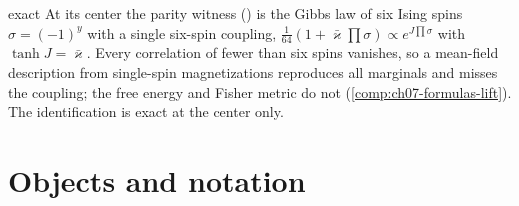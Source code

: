 \begin{analogy}{exact}
At its center the parity witness () is the Gibbs law of six
Ising spins $\sigma=(-1)^y$ with a single six-spin coupling, $\tfrac1{64}(1+\bar\varkappa\prod\sigma)
\propto e^{J\prod\sigma}$ with $\tanh J=\bar\varkappa$. Every correlation of fewer than six spins
vanishes, so a mean-field description from single-spin magnetizations reproduces all marginals and
misses the coupling; the free energy and Fisher metric do not (\cref{comp:ch07-formulas-lift}). The
identification is exact at the center only.
\end{analogy}

\section{Objects and notation}
\label{comp:ch07-objects}

